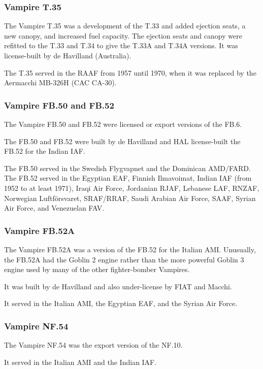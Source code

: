 \subsubsection{Vampire T.35}

The Vampire T.35 was a development of the T.33 and added ejection seats, a new canopy, and increased fuel capacity. The ejection seats and canopy were refitted to the T.33 and T.34 to give the T.33A and T.34A versions. It was license-built by de Havilland (Australia).

The T.35 served in the RAAF from 1957 until 1970, when it was replaced by the Aermacchi MB-326H (CAC CA-30).

\subsubsection{Vampire FB.50 and FB.52}

The Vampire FB.50 and FB.52 were licensed or export versions of the FB.6.

The FB.50 and FB.52 were built by de Havilland and HAL license-built the FB.52 for the Indian IAF.

The FB.50 served in the Swedish Flygvapnet and the Dominican AMD/FARD. The FB.52 served in the Egyptian EAF, Finnish Ilmavoimat, Indian IAF (from 1952 to at least 1971), Iraqi Air Force, Jordanian RJAF, Lebanese LAF, RNZAF, Norwegian Luftförsvaret, SRAF/RRAF, Saudi Arabian Air Force, SAAF, Syrian Air Force, and Venezuelan FAV.

\subsubsection{Vampire FB.52A}

The Vampire FB.52A was a version of the FB.52 for the Italian AMI. Unusually, the FB.52A had the Goblin 2 engine rather than the more powerful Goblin 3 engine used by many of the other fighter-bomber Vampires.

It was built by de Havilland and also under-license by FIAT and Macchi.

It served in the Italian AMI, the Egyptian EAF, and the Syrian Air Force.

\subsubsection{Vampire NF.54}

The Vampire NF.54 was the export version of the NF.10.

It served in the Italian AMI and the Indian IAF.

